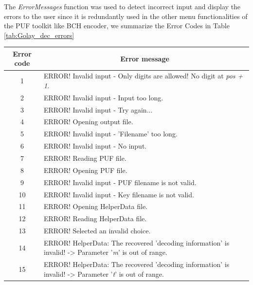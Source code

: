 	The \emph{ErrorMessages} function was used to detect incorrect input and display the errors to the user since it is redundantly used in the other menu functionalities of the PUF toolkit like BCH encoder, we summarize the Error Codes in Table \ref{tab:Golay_dec_errors}

	\begin{table}[!ht]
	\begin{center}
	\begin{tabular}{cp{13cm}}
	\toprule
	\multicolumn{1}{c}{\textbf{Error code}} & \multicolumn{1}{c}{\textbf{Error message}} \\
	\midrule
	\hline
	1 & ERROR! Invalid input - Only digits are allowed! No digit at \emph{pos + 1}.\\

	2 & ERROR! Invalid input - Input too long. \\

	3 & ERROR! Invalid input - Try again...  \\

	4 & ERROR! Opening output file. \\

	5 & ERROR! Invalid input - 'Filename' too long. \\

	6 & ERROR! Invalid input - No input. \\

	7 & ERROR! Reading PUF file. \\

	8 & ERROR! Opening PUF file. \\

	9 & ERROR! Invalid input - PUF filename is not valid.\\

	10 & ERROR! Invalid input - Key filename is not valid.\\

	11 & ERROR! Opening HelperData file. \\

	12 & ERROR! Reading HelperData file. \\

	13 & ERROR! Selected an invalid choice. \\

	14 & ERROR! HelperData: The recovered 'decoding information' is invalid! -> Parameter '\emph{m}' is out of range.\\

	15 & ERROR! HelperData: The recovered 'decoding information' is invalid! -> Parameter '\emph{t}' is out of range.\\


\end{tabular}
\end{center}
\end{table}
